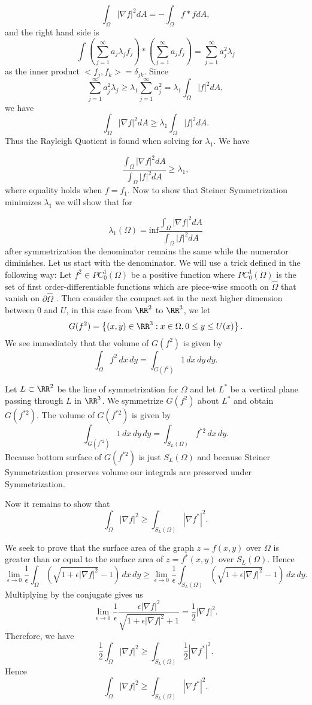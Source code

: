 \documentclass[12pt]{report}
\numberwithin{definition}{section}
\begin{document}
\[
\int_\Omega |\nabla f|^2 dA = -\int_\Omega f*f dA,
\]
and the right hand side is
\[
\int \left(\sum^\infty_{j=1}a_j\lambda_j f_j \right)*\left( \sum^\infty_{j=1}a_j f_j \right)=\sum^\infty_{j=1}a_j^2\lambda_j 
\]
	as the inner product  $<f_j, f_k> = \delta_{j k} $. Since
	\[
	\sum^\infty_{j=1}a_j^2\lambda_j \geq \lambda_1\sum^\infty_{j=1}a_j^2 = \lambda_1\int_{\Omega}|f|^2 dA,
	\]
	 we have 
	\[
	\int_\Omega |\nabla f|^2 dA \geq \lambda_1\int_{\Omega}|f|^2 dA.
	\]
	Thus the Rayleigh Quotient is found when solving for $\lambda_1$. We have 
	
	\[
	\frac{	\int_\Omega |\nabla f|^2 dA }{\int_{\Omega}|f|^2 dA} \geq \lambda_1,
	\]
	where equality holds when $f=f_1$. Now to show that Steiner Symmetrization minimizes $\lambda_1$ we will show that for 
	
	\[
	\lambda_1(\Omega) = \mbox{inf} \frac{	\int_\Omega |\nabla f|^2 dA }{\int_{\Omega}|f|^2 dA}
	\]
	after symmetrization the denominator remains the same while the numerator diminishes. 
	Let us start with the denominator. We will use a trick defined in the following way: Let $f^2 \in PC^1_0(\Omega)$ be a positive function where $PC^1_0(\Omega)$ is the set of first order-differentiable  functions which are piece-wise smooth on $\hat{\Omega}$ that vanish on $\partial \hat{\Omega}$  . Then consider the compact set in the next higher dimension between $0$ and $U$, in this case from $\RR^2$ to $\RR^3$, we let 
	\[
	G(f^2) = \left\{(x,y) \in \RR^3 : x\in \Omega, 0 \leq y \leq U(x)\right\}.
	\]
	We see immediately that the volume of $G(f^2)$ is given by 
	\[
	\int_\Omega f^2   \,dx  \,dy = \int_{G(f^2)} 1   \,dx  \,dy  \,dy . 
	\]
	
	Let $L \subset \RR^2$ be the line of symmetrization for $\Omega$ and let $L^*$ be a vertical plane passing through $L$ in $\RR^3$. We symmetrize $G(f^2)$ about $L^*$ and obtain $G(f^{*2})$. The volume of $G(f^{*2})$ is given by 
	\[
	 \int_{G(f^{*2})} 1   \,dx  \,dy  \,dy = \int_{S_L(\Omega)}f^{*2}  \,dx  \,dy .
	\]
Because bottom surface of $G(f^{*2})$ is just $S_L(\Omega)$ and because Steiner Symmetrization preserves volume our integrals are preserved under Symmetrization.

Now it remains to show that 
\[
\int_\Omega |\nabla f|^2 \geq \int_{S_L(\Omega)}|\nabla f^*|^2.
\]

We seek to prove that the surface area of the graph $z=f(x,y)$ over $\Omega$ is greater than or equal to the surface area of $z=f^*(x,y)$ over  $S_L(\Omega)$. Hence
\[
\lim_{\epsilon\rightarrow0} \frac{1}{\epsilon}\int_\Omega \left(\sqrt{1+\epsilon|\nabla f|^2}-1\right)  \,dx   \,dy\geq \lim_{\epsilon\rightarrow0} \frac{1}{\epsilon}\int_{S_L(\Omega)} \left(\sqrt{1+\epsilon|\nabla f|^2}-1\right)  \,dx   \,dy.
\]
Multiplying by the conjugate gives us 
\[
\lim_{\epsilon\rightarrow0} \frac{1}{\epsilon} \frac{\epsilon|\nabla f|^2}{\sqrt{1+\epsilon |\nabla f|^2}+1} = \frac{1}{2}|\nabla f|^2 . 
\]
Therefore, we have 
\[
\frac{1}{2}\int_\Omega |\nabla f|^2 \geq \int_{S_L(\Omega)}\frac{1}{2}|\nabla f^*|^2 .
\]
Hence
\[
\int_\Omega |\nabla f|^2 \geq \int_{S_L(\Omega)}|\nabla f^*|^2 . 
\]
\end{document}
